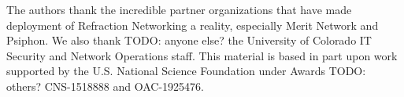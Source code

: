 \documentclass[sigconf]{acmart}
\newcommand{\TODO}[1]{}
\renewcommand{\TODO}[1]{{\color{red} TODO: {#1}}}
\begin{document}
\begin{acks}
  The authors thank the incredible partner organizations that have
  made deployment of Refraction Networking a reality, especially Merit
  Network and Psiphon. We also thank \TODO{anyone else?} the
  University of Colorado IT Security and Network Operations
  staff. This material is based in part upon work supported by the
  U.S. National Science Foundation under Awards \TODO{others?}
  CNS-1518888 and OAC-1925476.
\end{acks}


\balance


%
\end{document}
